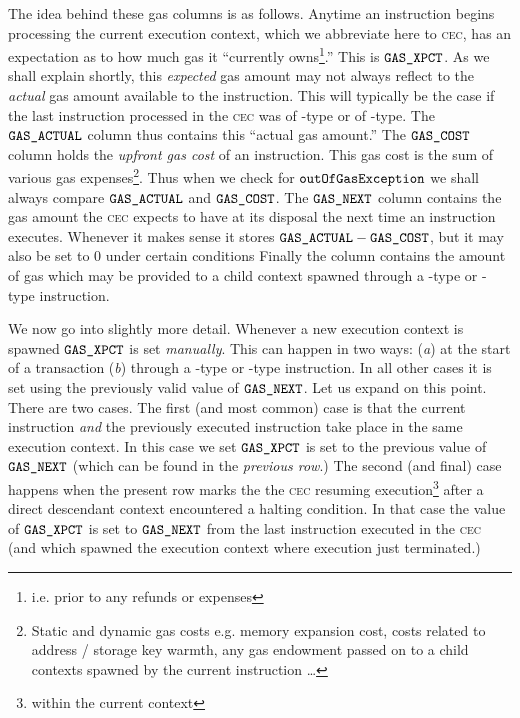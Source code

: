 The idea behind these gas columns is as follows.
Anytime an instruction begins processing the current execution context, which we abbreviate here to \textsc{cec}, has an expectation as to how much gas it ``currently owns\footnote{i.e. prior to any refunds or expenses}.''
This is $\texttt{GAS}\texttt{\_XPCT}$.
As we shall explain shortly, this \emph{expected} gas amount may not always reflect to the \emph{actual} gas amount available to the instruction.
This will typically be the case if the last instruction processed in the \textsc{cec} was of -type or of -type.
The $\texttt{GAS}\texttt{\_ACTUAL}$ column thus contains this ``actual gas amount.''
The $\texttt{GAS}\texttt{\_COST}$ column holds the \emph{upfront gas cost} of an instruction.
This gas cost is the sum of various gas expenses\footnote{Static and dynamic gas costs e.g. memory expansion cost, costs related to address / storage key warmth, any gas endowment passed on to a child contexts spawned by the current instruction \dots{}}.
Thus when we check for $\texttt{outOfGasException}$ we shall always compare $\texttt{GAS}\texttt{\_ACTUAL}$ and $\texttt{GAS}\texttt{\_COST}$.
The $\texttt{GAS}\texttt{\_NEXT}$ column contains the gas amount the \textsc{cec} expects to have at its disposal the next time an instruction executes.
Whenever it makes sense it stores $\texttt{GAS}\texttt{\_ACTUAL}- \texttt{GAS}\texttt{\_COST}$, but it may also be set to 0 under certain conditions %
Finally the \gasStipend{} column contains the amount of gas which may be provided to a child context spawned through a -type or -type instruction. 

We now go into slightly more detail. Whenever a new execution context is spawned $\texttt{GAS}\texttt{\_XPCT}$ is set \emph{manually}. This can happen in two ways: 
(\emph{a}) at the start of a transaction
(\emph{b}) through a -type or -type instruction.
In all other cases it is set using the previously valid value of $\texttt{GAS}\texttt{\_NEXT}$. Let us expand on this point. There are two cases.
The first (and most common) case is that the current instruction \emph{and} the previously executed instruction take place in the same execution context.
In this case we set $\texttt{GAS}\texttt{\_XPCT}$ is set to the previous value of $\texttt{GAS}\texttt{\_NEXT}$ (which can be found in the \emph{previous row}.)
The second (and final) case happens when the present row marks the the \textsc{cec} resuming execution\footnote{within the current context} after a direct descendant context encountered a halting condition.
In that case the value of $\texttt{GAS}\texttt{\_XPCT}$ is set to $\texttt{GAS}\texttt{\_NEXT}$ from the last instruction executed in the \textsc{cec} (and which spawned the execution context where execution just terminated.)

